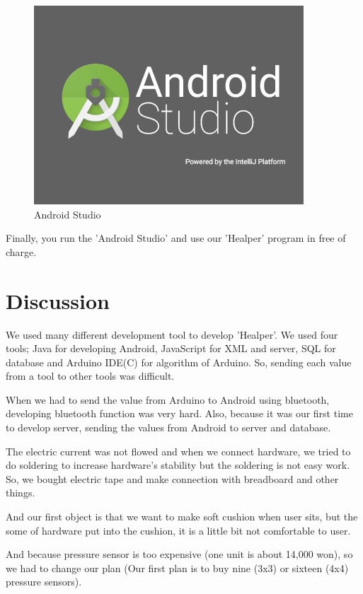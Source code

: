\documentclass[conference]{IEEEtran}
\begin{document}
\begin{figure}[H]
\begin{center}
    \includegraphics[scale=0.88]{android2}
    \caption{Android Studio} 
\end{center}
\end{figure}

Finally, you run the 'Android Studio' and use our 'Healper' program in free of charge.\\

\section{Discussion}


We used many different development tool to develop 'Healper'. We used four tools; Java for developing Android, JavaScript for XML and server, SQL for database and Arduino IDE(C) for algorithm of Arduino. So, sending each value from a tool to other tools was difficult.

When we had to send the value from Arduino to Android using bluetooth, developing bluetooth function was very hard. Also, because it was our first time to develop server, sending the values from Android to server and database.

The electric current was not flowed and when we connect hardware, we tried to do soldering to increase hardware's stability but the soldering is not easy work. So, we bought electric tape and make connection with breadboard and other things. 

And our first object is that we want to make soft cushion when user sits, but the some of hardware put into the cushion, it is a little bit not comfortable to user. 

And because pressure sensor is too expensive (one unit is about 14,000 won), so we had to change our plan (Our first plan is to buy nine (3x3) or sixteen (4x4) pressure sensors).  
 
\end{document}
